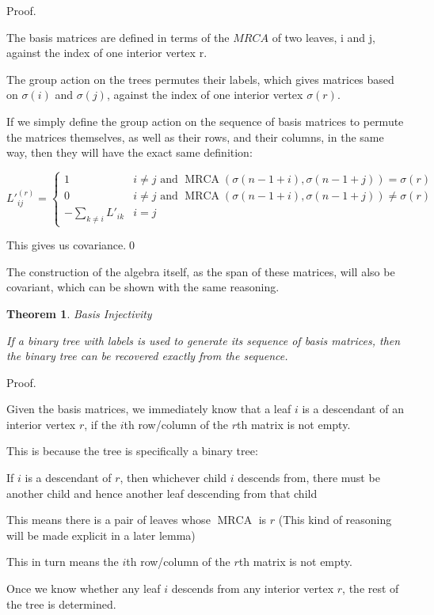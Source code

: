\documentclass[10pt,a4paper]{report}
\DeclareMathOperator{\MRCA}{MRCA}
\newtheorem{theorem}{Theorem}
\begin{document}
Proof.

The basis matrices are defined in terms of the $MRCA$ of two leaves, i and j, against the index of one interior vertex r.

The group action on the trees permutes their labels, which gives matrices based on $\sigma(i)$ and $\sigma(j)$, against the index of one interior vertex $\sigma(r)$.

If we simply define the group action on the sequence of basis matrices to permute the matrices themselves, as well as their rows, and their columns, in the same way, then they will have the exact same definition:

\[ L\prime_{ij}^(r) = \begin{cases}
	1 & i \neq j \textrm{ and } \MRCA(\sigma(n-1+i), \sigma(n-1+j)) = \sigma(r)\\
	0 & i \neq j \textrm{ and } \MRCA(\sigma(n-1+i), \sigma(n-1+j)) \neq \sigma(r)\\
	-\sum_{k \neq i} L\prime_{ik} & i = j
\end{cases} \]

This gives us covariance.\qed

The construction of the algebra itself, as the span of these matrices, will also be covariant, which can be shown with the same reasoning.

\begin{theorem} Basis Injectivity

	If a binary tree with labels is used to generate its sequence of basis matrices, then the binary tree can be recovered exactly from the sequence.
\end{theorem}

Proof.

Given the basis matrices, we immediately know that a leaf $i$ is a descendant of an interior vertex $r$, if the $i$th row/column of the $r$th matrix is not empty.

This is because the tree is specifically a binary tree:

If $i$ is a descendant of $r$, then whichever child $i$ descends from, there must be another child and hence another leaf descending from that child

This means there is a pair of leaves whose $\MRCA$ is $r$ (This kind of reasoning will be made explicit in a later lemma)

This in turn means the $i$th row/column of the $r$th matrix is not empty.

Once we know whether any leaf $i$ descends from any interior vertex $r$, the rest of the tree is determined.
\end{document}
